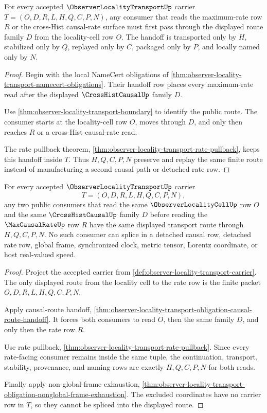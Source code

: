 \begin{theorem}
\label{thm:observer-locality-transport-obligation-causal-route-handoff}
For every accepted $\ObserverLocalityTransportUp$ carrier $T=(O,D,R,L,H,Q,C,P,N)$, any consumer that reads the maximum-rate row $R$ or the cross-Hist causal-rate surface must first pass through the displayed route family $D$ from the locality-cell row $O$. The handoff is transported only by $H$, stabilized only by $Q$, replayed only by $C$, packaged only by $P$, and locally named only by $N$.
\end{theorem}
\begin{proof}
Begin with the local NameCert obligations of \autoref{thm:observer-locality-transport-namecert-obligations}. Their handoff row places every maximum-rate read after the displayed $\CrossHistCausalUp$ family $D$.

Use \autoref{thm:observer-locality-transport-boundary} to identify the public route. The consumer starts at the locality-cell row $O$, moves through $D$, and only then reaches $R$ or a cross-Hist causal-rate read.

The rate pullback theorem, \autoref{thm:observer-locality-transport-rate-pullback}, keeps this handoff inside $T$. Thus $H,Q,C,P,N$ preserve and replay the same finite route instead of manufacturing a second causal path or detached rate row.
\end{proof}

\begin{theorem}
\label{thm:observer-locality-transport-route-composition-determinacy}
For every accepted $\ObserverLocalityTransportUp$ carrier
$$
T=(O,D,R,L,H,Q,C,P,N),
$$
any two public consumers that read the same $\ObserverLocalityCellUp$ row $O$ and the same $\CrossHistCausalUp$ family $D$ before reading the $\MaxCausalRateUp$ row $R$ have the same displayed transport route through $H,Q,C,P,N$. No such consumer can splice in a detached causal row, detached rate row, global frame, synchronized clock, metric tensor, Lorentz coordinate, or host real-valued speed.
\end{theorem}
\begin{proof}
Project the accepted carrier from \autoref{def:observer-locality-transport-carrier}. The only displayed route from the locality cell to the rate row is the finite packet $O,D,R,L,H,Q,C,P,N$.

Apply causal-route handoff, \autoref{thm:observer-locality-transport-obligation-causal-route-handoff}. It forces both consumers to read $O$, then the same family $D$, and only then the rate row $R$.

Use rate pullback, \autoref{thm:observer-locality-transport-rate-pullback}. Since every rate-facing consumer remains inside the same tuple, the continuation, transport, stability, provenance, and naming rows are exactly $H,Q,C,P,N$ for both reads.

Finally apply non-global-frame exhaustion, \autoref{thm:observer-locality-transport-obligation-nonglobal-frame-exhaustion}. The excluded coordinates have no carrier row in $T$, so they cannot be spliced into the displayed route.
\end{proof}

